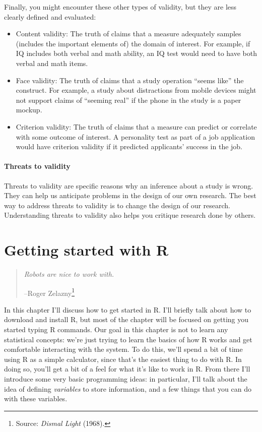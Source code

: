 \documentclass[
]{book}
\providecommand{\tightlist}{%
  \setlength{\itemsep}{0pt}\setlength{\parskip}{0pt}}
\begin{document}
Finally, you might encounter these other types of validity, but they are less clearly defined and evaluated:

\begin{itemize}
\tightlist
\item
  Content validity: The truth of claims that a measure adequately samples (includes the important elements of) the domain of interest. For example, if IQ includes both verbal and math ability, an IQ test would need to have both verbal and math items.
\item
  Face validity: The truth of claims that a study operation ``seems like'' the construct. For example, a study about distractions from mobile devices might not support claims of ``seeming real'' if the phone in the study is a paper mockup.
\item
  Criterion validity: The truth of claims that a measure can predict or correlate with some outcome of interest. A personality test as part of a job application would have criterion validity if it predicted applicants' success in the job.
\end{itemize}

\hypertarget{threats-to-validity}{%
\subsubsection{Threats to validity}\label{threats-to-validity}}

Threats to validity are specific reasons why an inference about a study is wrong. They can help us anticipate problems in the design of our own research. The best way to address threats to validity is to change the design of our research. Understanding threats to validity also helps you critique research done by others.

\hypertarget{introR}{%
\chapter{Getting started with R}\label{introR}}

\begin{quote}
\emph{Robots are nice to work with.}

--Roger Zelazny\footnote{Source: \emph{Dismal Light} (1968).}
\end{quote}

In this chapter I'll discuss how to get started in R. I'll briefly talk about how to download and install R, but most of the chapter will be focused on getting you started typing R commands. Our goal in this chapter is not to learn any statistical concepts: we're just trying to learn the basics of how R works and get comfortable interacting with the system. To do this, we'll spend a bit of time using R as a simple calculator, since that's the easiest thing to do with R. In doing so, you'll get a bit of a feel for what it's like to work in R. From there I'll introduce some very basic programming ideas: in particular, I'll talk about the idea of defining \emph{variables} to store information, and a few things that you can do with these variables.
\end{document}
